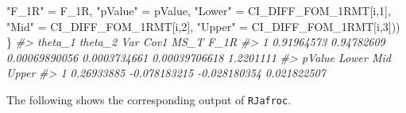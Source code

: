 \documentclass[
]{book}
\newenvironment{Shaded}{\begin{snugshade}}{\end{snugshade}}
\newcommand{\CommentTok}[1]{\textcolor[rgb]{0.56,0.35,0.01}{\textit{#1}}}
\newcommand{\DecValTok}[1]{\textcolor[rgb]{0.00,0.00,0.81}{#1}}
\newcommand{\NormalTok}[1]{#1}
\newcommand{\StringTok}[1]{\textcolor[rgb]{0.31,0.60,0.02}{#1}}
\begin{document}
\begin{Shaded}
\begin{Highlighting}[]
                   \StringTok{"F\_1R"}\NormalTok{ =}\StringTok{ }\NormalTok{F\_1R, }
                   \StringTok{"pValue"}\NormalTok{ =}\StringTok{ }\NormalTok{pValue,}
                   \StringTok{"Lower"}\NormalTok{ =}\StringTok{ }\NormalTok{CI\_DIFF\_FOM\_1RMT[i,}\DecValTok{1}\NormalTok{], }
                   \StringTok{"Mid"}\NormalTok{ =}\StringTok{ }\NormalTok{CI\_DIFF\_FOM\_1RMT[i,}\DecValTok{2}\NormalTok{], }
                   \StringTok{"Upper"}\NormalTok{ =}\StringTok{ }\NormalTok{CI\_DIFF\_FOM\_1RMT[i,}\DecValTok{3}\NormalTok{]))}
\NormalTok{\}}
\CommentTok{\#\textgreater{}      theta\_1    theta\_2           Var         Cov1          MS\_T      F\_1R}
\CommentTok{\#\textgreater{} 1 0.91964573 0.94782609 0.00069890056 0.0003734661 0.00039706618 1.2201111}
\CommentTok{\#\textgreater{}       pValue        Lower          Mid       Upper}
\CommentTok{\#\textgreater{} 1 0.26933885 {-}0.078183215 {-}0.028180354 0.021822507}
\end{Highlighting}
\end{Shaded}

The following shows the corresponding output of \texttt{RJafroc}.
\end{document}
